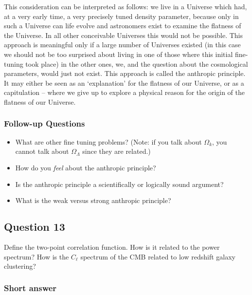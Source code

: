\documentclass[a4paper,11pt]{article}
\begin{document}
{\noindent}This consideration can be interpreted as follows: we live in a Universe which had, at a very early time, a very precisely tuned density parameter, because only in such a Universe can life evolve and astronomers exist to examine the flatness of the Universe. In all other conceivable Universes this would not be possible. This approach is meaningful only if a large number of Universes existed (in this case we should not be too surprised about living in one of those where this initial fine-tuning took place) in the other ones, we, and the question about the cosmological parameters, would just not exist. This approach is called the anthropic principle. It may either be seen as an `explanation' for the flatness of our Universe, or as a capitulation -- where we give up to explore a physical reason for the origin of the flatness of our Universe.

\subsubsection{Follow-up Questions}

\begin{itemize}
    \item What are other fine tuning problems? (Note: if you talk about $\Omega_k$, you cannot talk about $\Omega_\Lambda$ since they are related.)
    \item How do you \textit{feel} about the anthropic principle?
    \item Is the anthropic principle a scientifically or logically sound argument?
    \item What is the weak versus strong anthropic principle?
\end{itemize}


%
%

\newpage
\subsection{Question 13}

Define the two-point correlation function. How is it related to the power spectrum? How is the $C_\ell$ spectrum of the CMB related to low redshift galaxy clustering?

\subsubsection{Short answer}
\end{document}
